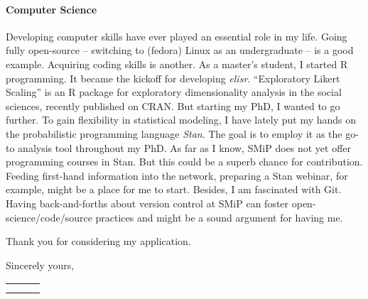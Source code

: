\documentclass[11pt]{FreemanML}
\begin{document}
\paragraph{Computer Science}

Developing computer skills have ever played an essential role in my life. Going
fully open-source -- switching to (fedora) Linux as an undergraduate -- is a
good example. Acquiring coding skills is another. As a master's student, I
started R programming. It became the kickoff for developing \textit{elisr}.
\enquote{Exploratory Likert Scaling} is an R package for exploratory
dimensionality analysis in the social sciences, recently published on CRAN. But
starting my PhD, I wanted to go further. To gain flexibility in statistical
modeling, I have lately put my hands on the probabilistic programming language
\textit{Stan}. The goal is to employ it as the go-to analysis tool throughout
my PhD. As far as I know, SMiP does not yet offer programming courses in Stan.
But this could be a superb chance for contribution. Feeding first-hand
information into the network, preparing a Stan webinar, for example, might be a
place for me to start. Besides, I am fascinated with Git. Having
back-and-forths about version control at SMiP can foster
open-science/code/source practices and might be a sound argument for having me.

\medskip

Thank you for considering my application.

\medskip

Sincerely yours,

\bigskip
\bigskip


\begin{tabular}{p{8cm}p{.5cm}l}
\dotfill \\ 
\centering{Steven Marcel Bißantz} 
\end{tabular}%
\vfill

\end{document}

